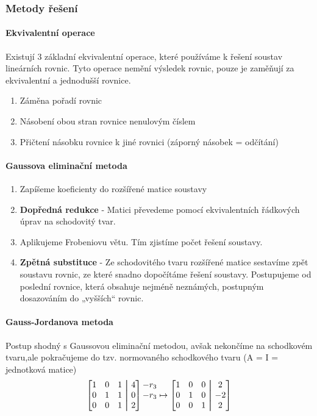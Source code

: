 \documentclass[10pt,a4paper]{article}
\newcommand\aug{\fboxsep=-\fboxrule\!\!\!\fbox{\strut}\!\!\!}
\begin{document}
\subsubsection{Metody řešení}
\paragraph{Ekvivalentní operace}
Existují 3 základní ekvivalentní operace, které používáme k řešení soustav lineárních rovnic. Tyto operace nemění výsledek rovnic, pouze je zaměňují za ekvivalentní a jednodušší rovnice.
\begin{enumerate}
\item Záměna pořadí rovnic
\item Násobení obou stran rovnice nenulovým číslem
\item Přičtení násobku rovnice k jiné rovnici (záporný násobek = odčítání)
\end{enumerate}
\paragraph{Gaussova eliminační metoda}
\begin{enumerate}
\item Zapíšeme koeficienty do rozšířené matice soustavy
\item \textbf{Dopředná redukce} - Matici převedeme pomocí ekvivalentních řádkových úprav na schodovitý tvar.
\item Aplikujeme Frobeniovu větu. Tím zjistíme počet řešení soustavy.
\item \textbf{Zpětná substituce} - Ze schodovitého tvaru rozšířené matice sestavíme zpět soustavu rovnic, ze které snadno dopočítáme řešení soustavy. Postupujeme od poslední rovnice, která obsahuje nejméně neznámých, postupným dosazováním do „vyšších“ rovnic.
\end{enumerate}
\paragraph{Gauss-Jordanova metoda}
Postup shodný s Gaussovou eliminační metodou, avšak nekončíme na schodkovém tvaru,ale pokračujeme do tzv. normovaného schodkového tvaru (A = I = jednotková matice)
\begin{equation}
\begin{bmatrix}
1 & 0 & 1 &\aug& 4\\ 
0 & 1 & 1 &\aug& 0\\ 
0 & 0 & 1 &\aug& 2
\end{bmatrix} 
\begin{matrix}
-r_3\\ 
-r_3\\ 
~
\end{matrix} 
\mapsto
\begin{bmatrix}
1 & 0 & 0 &\aug& 2\\ 
0 & 1 & 0 &\aug& -2\\ 
0 & 0 & 1 &\aug& 2
\end{bmatrix}   
\end{equation}
\end{document}
